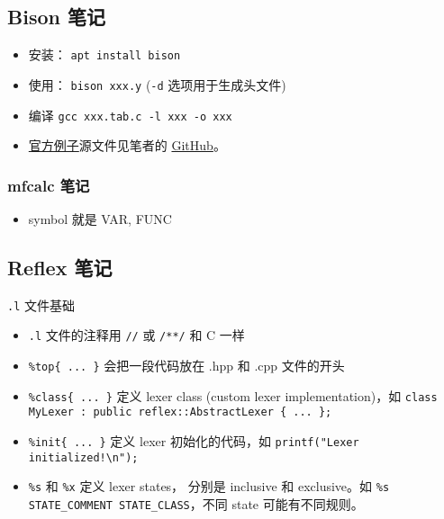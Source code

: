 \subsection{Bison 笔记}
\begin{itemize}
\item 安装： \verb`apt install bison`
\item 使用： \verb`bison xxx.y` (\verb`-d` 选项用于生成头文件)
\item 编译 \verb`gcc xxx.tab.c -l xxx -o xxx`
\item \href{http://web.mit.edu/gnu/doc/html/bison_5.html}{官方例子}源文件见笔者的 \href{https://github.com/MacroUniverse/bison_test}{GitHub}。
\end{itemize}

\subsubsection{mfcalc 笔记}
\begin{itemize}
\item symbol 就是 VAR, FUNC
\end{itemize}

\subsection{Reflex 笔记}
\verb`.l` 文件基础
\begin{itemize}
\item \verb`.l` 文件的注释用 \verb`//` 或 \verb`/**/` 和 C 一样
\item \verb`%top{ ... }` 会把一段代码放在 .hpp 和 .cpp 文件的开头
\item \verb`%class{ ... }` 定义 lexer class (custom lexer implementation)，如 \verb`class MyLexer : public reflex::AbstractLexer { ... };`
\item \verb`%init{ ... }` 定义 lexer 初始化的代码，如 \verb`printf("Lexer initialized!\n");`
\item \verb`%s` 和 \verb`%x` 定义 lexer states， 分别是 inclusive 和 exclusive。如 \verb`%s STATE_COMMENT STATE_CLASS`，不同 state 可能有不同规则。
\end{itemize}
